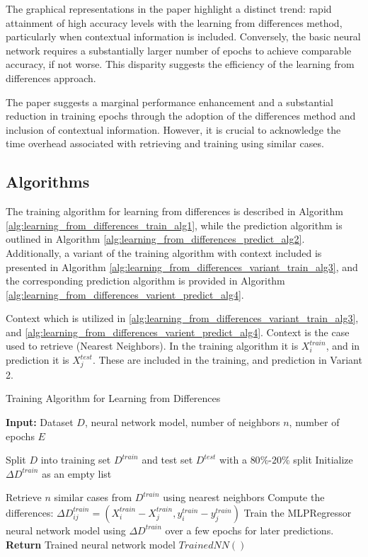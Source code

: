 \documentclass[a4paper, 12pt]{report}
\begin{document}
The graphical representations in the paper highlight a distinct trend: rapid attainment of high accuracy levels with the learning from differences method,
particularly when contextual information is included. Conversely, the basic neural network requires a substantially larger number of epochs to achieve comparable accuracy, if not worse.
This disparity suggests the efficiency of the learning from differences approach.

The paper suggests a marginal performance enhancement and a substantial reduction in training epochs through the adoption of the differences method and inclusion of contextual information.
However, it is crucial to acknowledge the time overhead associated with retrieving and training using similar cases.

\subsection{Algorithms}

The training algorithm for learning from differences is described in Algorithm \ref{alg:learning_from_differences_train_alg1}, 
while the prediction algorithm is outlined in Algorithm \ref{alg:learning_from_differences_predict_alg2}.
Additionally, a variant of the training algorithm with context included is presented in Algorithm \ref{alg:learning_from_differences_variant_train_alg3}, and the
corresponding prediction algorithm is provided in Algorithm \ref{alg:learning_from_differences_varient_predict_alg4}.

Context which is utilized in \ref{alg:learning_from_differences_variant_train_alg3}, and \ref{alg:learning_from_differences_varient_predict_alg4}. 
Context is the case used to retrieve (Nearest Neighbors). In the training algorithm it is $X^{train}_i$, and in prediction it is $X^{test}_j$. 
These are included in the training, and prediction in Variant 2.
\begin{algorithm}
	\caption{Training Algorithm for Learning from Differences}
	\label{alg:learning_from_differences_train_alg1}

	\textbf{Input:} Dataset $D$, neural network model, number of neighbors $n$, number of epochs $E$
	\begin{algorithmic}[1]
        \State Split $D$ into training set $D^{train}$ and test set $D^{test}$ with a $80\%$-$20\%$ split
        \State Initialize $\Delta D^{train}$ as an empty list
        
            \State Retrieve $n$ similar cases from $D^{train}$ using nearest neighbors
                \State Compute the differences: $\Delta D^{train}_{ij} = (X^{train}_i - X^{train}_j, y^{train}_i - y^{train}_j)$
            \EndFor
        \EndFor
        \State Train the MLPRegressor neural network model using $\Delta D^{train}$ over a few epochs for later predictions.
        \State \textbf{Return} Trained neural network model $Trained NN()$
    \end{algorithmic}
\end{algorithm}
\end{document}

